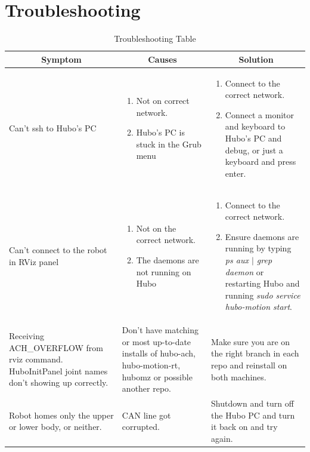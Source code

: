 \documentclass[letterpaper, 10 pt]{report}
\begin{document}
\chapter{Troubleshooting}\label{chap:troubleshooting}
\begin{table}[ht]
  \centering
  \caption{Troubleshooting Table}
  \begin{tabular}{|p{4.5cm}|p{4.5cm}|p{4.5cm}|} \hline
    \multicolumn{1}{|c|}{Symptom} & \multicolumn{1}{|c|}{Causes} & \multicolumn{1}{|c|}{Solution} \\ \hline
    Can't ssh to Hubo's PC & \begin{enumerate} \item Not on correct network. \item Hubo's PC is stuck in the Grub menu \end{enumerate} & \begin{enumerate} \item Connect to the correct network. \item Connect a monitor and keyboard to Hubo's PC and debug, or just a keyboard and press enter. \end{enumerate} \\
    \hline
    Can't connect to the robot in RViz panel & \begin{enumerate} \item Not on the correct network. \item The daemons are not running on Hubo \end{enumerate} & \begin{enumerate} \item Connect to the correct network. \item Ensure daemons are running by typing \textit{ps aux $|$ grep daemon} or restarting Hubo and running \textit{sudo service hubo-motion start}. \end{enumerate} \\
    \hline
    Receiving ACH\_OVERFLOW from rviz command. \newline HuboInitPanel joint names don't showing up correctly. & Don't have matching or most up-to-date installs of hubo-ach, hubo-motion-rt, hubomz or possible another repo. & Make sure you are on the right branch in each repo and reinstall on both machines. \\
    \hline
    Robot homes only the upper or lower body, or neither. & CAN line got corrupted. & Shutdown and turn off the Hubo PC and turn it back on and try again. \\
    \hline
  \end{tabular} \label{tbl:troubleshooting}
\end{table}


%

\end{document}
